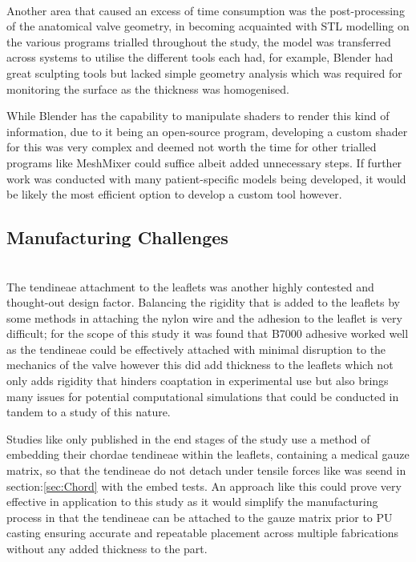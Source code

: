 \\
Another area that caused an excess of time consumption was the post-processing of the anatomical valve geometry, in becoming acquainted with STL modelling on the various programs trialled throughout the study, the model was transferred across systems to utilise the different tools each had, for example, Blender had great sculpting tools but lacked simple geometry analysis which was required for monitoring the surface as the thickness was homogenised.

While Blender has the capability to manipulate shaders to render this kind of information, due to it being an open-source program, developing a custom shader for this was very complex and deemed not worth the time for other trialled programs like MeshMixer could suffice albeit added unnecessary steps. If further work was conducted with many patient-specific models being developed, it would be likely the most efficient option to develop a custom tool however.

\subsection{Manufacturing Challenges}

\\
The tendineae attachment to the leaflets was another highly contested and thought-out design factor. Balancing the rigidity that is added to the leaflets by some methods in attaching the nylon wire and the adhesion to the leaflet is very difficult; for the scope of this study it was found that B7000 adhesive worked well as the tendineae could be effectively attached with minimal disruption to the mechanics of the valve however this did add thickness to the leaflets which not only adds rigidity that hinders coaptation in experimental use but also brings many issues for potential computational simulations that could be conducted in tandem to a study of this nature.

Studies like  only published in the end stages of the study use a method of embedding their chordae tendineae within the leaflets, containing a medical gauze matrix, so that the tendineae do not detach under tensile forces like was seend in section:\cref{sec:Chord} with the embed tests. An approach like this could prove very effective in application to this study as it would simplify the manufacturing process in that the tendineae can be attached to the gauze matrix prior to \gls{PU} casting ensuring accurate and repeatable placement across multiple fabrications without any added thickness to the part.

